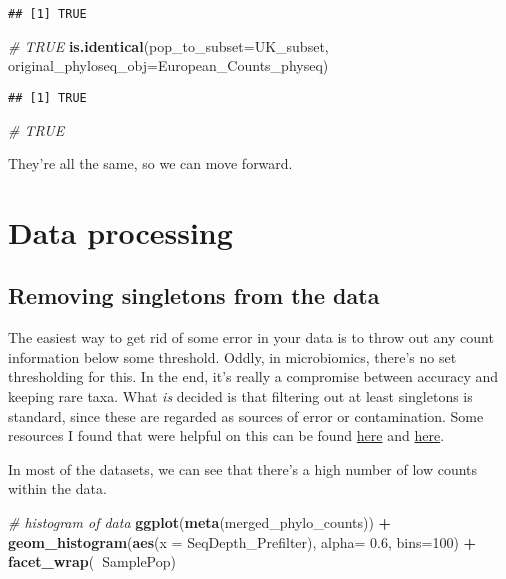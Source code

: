 \documentclass[]{article}
\newenvironment{Shaded}{\begin{snugshade}}{\end{snugshade}}
\newcommand{\CommentTok}[1]{\textcolor[rgb]{0.56,0.35,0.01}{\textit{#1}}}
\newcommand{\DataTypeTok}[1]{\textcolor[rgb]{0.13,0.29,0.53}{#1}}
\newcommand{\DecValTok}[1]{\textcolor[rgb]{0.00,0.00,0.81}{#1}}
\newcommand{\FloatTok}[1]{\textcolor[rgb]{0.00,0.00,0.81}{#1}}
\newcommand{\KeywordTok}[1]{\textcolor[rgb]{0.13,0.29,0.53}{\textbf{#1}}}
\newcommand{\NormalTok}[1]{#1}
\newcommand{\OperatorTok}[1]{\textcolor[rgb]{0.81,0.36,0.00}{\textbf{#1}}}
\newcommand{\StringTok}[1]{\textcolor[rgb]{0.31,0.60,0.02}{#1}}
\begin{document}
\begin{verbatim}
## [1] TRUE
\end{verbatim}

\begin{Shaded}
\begin{Highlighting}[]
\CommentTok{# TRUE}
\KeywordTok{is.identical}\NormalTok{(}\DataTypeTok{pop_to_subset=}\NormalTok{UK_subset, }\DataTypeTok{original_phyloseq_obj=}\NormalTok{European_Counts_physeq)}
\end{Highlighting}
\end{Shaded}

\begin{verbatim}
## [1] TRUE
\end{verbatim}

\begin{Shaded}
\begin{Highlighting}[]
\CommentTok{# TRUE}
\end{Highlighting}
\end{Shaded}

They're all the same, so we can move forward.

\hypertarget{data-processing}{%
\section{Data processing}\label{data-processing}}

\hypertarget{removing-singletons-from-the-data}{%
\subsection{Removing singletons from the
data}\label{removing-singletons-from-the-data}}

The easiest way to get rid of some error in your data is to throw out
any count information below some threshold. Oddly, in microbiomics,
there's no set thresholding for this. In the end, it's really a
compromise between accuracy and keeping rare taxa. What \emph{is}
decided is that filtering out at least singletons is standard, since
these are regarded as sources of error or contamination. Some resources
I found that were helpful on this can be found
\href{http://drive5.com/usearch/manual/singletons.html}{here} and
\href{https://forum.qiime2.org/t/do-you-guys-still-remove-singletons-or-doubletons-these-days/7138/2}{here}.

In most of the datasets, we can see that there's a high number of low
counts within the data.

\begin{Shaded}
\begin{Highlighting}[]
\CommentTok{# histogram of data}
\KeywordTok{ggplot}\NormalTok{(}\KeywordTok{meta}\NormalTok{(merged_phylo_counts)) }\OperatorTok{+}\StringTok{ }\KeywordTok{geom_histogram}\NormalTok{(}\KeywordTok{aes}\NormalTok{(}\DataTypeTok{x =}\NormalTok{ SeqDepth_Prefilter), }\DataTypeTok{alpha=} \FloatTok{0.6}\NormalTok{, }\DataTypeTok{bins=}\DecValTok{100}\NormalTok{) }\OperatorTok{+}\StringTok{ }\KeywordTok{facet_wrap}\NormalTok{(}\OperatorTok{~}\NormalTok{SamplePop)}
\end{Highlighting}
\end{Shaded}
\end{document}
